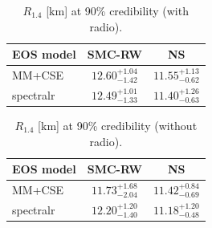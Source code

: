 

\begin{table}[h]
    \centering
    \begin{tabular}{lcc}
        \hline
        EOS model & SMC-RW & NS \\
        \hline
        MM+CSE & $12.60^{+1.04}_{-1.42}$ & $11.55^{+1.13}_{-0.62}$ \\
        spectralr & $12.49^{+1.01}_{-1.33}$ & $11.40^{+1.26}_{-0.63}$ \\
        \hline
    \end{tabular}
    \caption{$R_{1.4}$ [km] at 90\% credibility (with radio).}
\end{table}


\begin{table}[h]
    \centering
    \begin{tabular}{lcc}
        \hline
        EOS model & SMC-RW & NS \\
        \hline
        MM+CSE & $11.73^{+1.68}_{-2.04}$ & $11.42^{+0.84}_{-0.69}$ \\
        spectralr & $12.20^{+1.20}_{-1.40}$ & $11.18^{+1.20}_{-0.48}$ \\
        \hline
    \end{tabular}
    \caption{$R_{1.4}$ [km] at 90\% credibility (without radio).}
\end{table}
